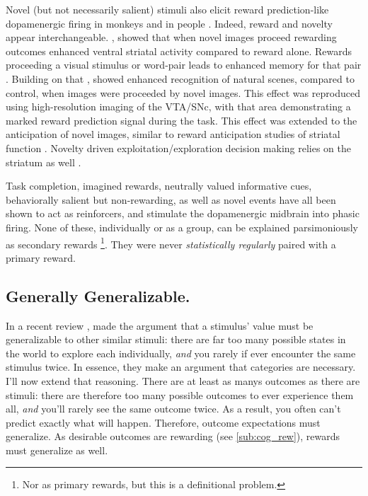 \documentclass[doc,12pt]{apa}        %
\begin{document}
Novel (but not necessarily salient) stimuli also elicit reward prediction-like dopamenergic firing in monkeys \cite{Blatter:2006p6372} and in people \cite{Bunzeck:2006p5319}. Indeed, reward and novelty appear interchangeable.  , showed that when novel images proceed rewarding outcomes enhanced ventral striatal activity compared to reward alone.  Rewards proceeding a visual stimulus or word-pair leads to enhanced memory for that pair \cite{Lisman:2005p5455}.  Building on that , showed enhanced recognition of natural scenes, compared to control, when images were proceeded by novel images.  This effect was reproduced using high-resolution imaging of the VTA/SNc, with that area demonstrating a marked reward prediction signal during the task.  This effect was extended to the anticipation of novel images, similar to reward anticipation studies of striatal function \cite{Knutson:2001p5234}.  Novelty driven exploitation/exploration decision making relies on the striatum as well \cite{Wittmann:2008p541}.

Task completion, imagined rewards, neutrally valued informative cues, behaviorally salient but non-rewarding, as well as novel events have all been shown to act as reinforcers, and stimulate the dopamenergic midbrain into phasic firing.  None of these, individually or as a group, can be explained parsimoniously as secondary rewards
\footnote{
    Nor as primary rewards, but this is a definitional problem.
}.  They were never \emph{statistically regularly} paired with a primary reward.


\subsection{Generally Generalizable.}
\label{sub:gen}
In a recent review , made the argument that a stimulus' value must be generalizable to other similar stimuli: there are far too many possible states in the world to explore each individually, \emph{and} you rarely if ever encounter the same stimulus twice.  In essence, they make an argument that categories are necessary.  I'll now extend that reasoning.  There are at least as manys outcomes as there are stimuli: there are therefore too many possible outcomes to ever experience them all, \emph{and} you'll rarely see the same outcome twice.  As a result, you often can't predict exactly what will happen. Therefore, outcome expectations must generalize.  As desirable outcomes are rewarding (see \ref{sub:cog_rew}), rewards must generalize as well.
\end{document}
